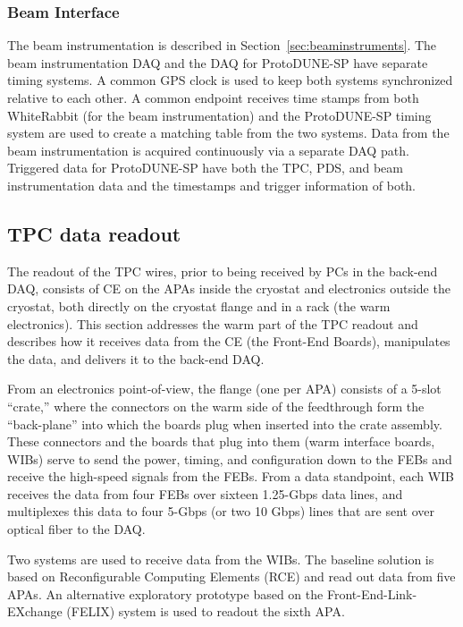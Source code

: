 \subsubsection{Beam Interface}

The beam instrumentation is described in Section~\ref{sec:beaminstruments}.
The beam instrumentation DAQ and the DAQ for ProtoDUNE-SP
have separate timing systems.  A common GPS clock is used to keep both
systems synchronized relative to each other.  A common endpoint receives time stamps 
from both WhiteRabbit (for the beam instrumentation) and the ProtoDUNE-SP timing system
are used to create a matching table from the two systems.  
Data from the beam
instrumentation is acquired continuously via a separate DAQ path.   Triggered
data for ProtoDUNE-SP have both the TPC, PDS, and beam instrumentation data and 
the timestamps and trigger information of both. 

\subsection{TPC data readout}

The readout of the TPC wires, prior to being received by PCs in
the back-end DAQ, consists of  CE on the APAs
inside the cryostat and electronics outside
the cryostat, both directly on the cryostat flange and in a rack (the
warm electronics).  This section
addresses the warm part of the TPC
readout and describes how it receives data from the CE (the Front-End
Boards), manipulates the data, and delivers it to the back-end DAQ.

From an electronics point-of-view, the flange (one per APA) consists of a
5-slot ``crate,'' where the connectors on the warm side of the feedthrough 
form the ``back-plane'' into which the boards plug when inserted
into the crate assembly. 
  These connectors and the boards that plug
into them (warm interface boards, WIBs) serve to send the power,
timing, and configuration down to the FEBs  and receive the high-speed
signals from the FEBs. From a data standpoint, each WIB receives the
data from four FEBs over sixteen 1.25-Gbps data lines, and multiplexes
this data to four 5-Gbps (or two 10 Gbps) lines that are sent over
optical fiber to the DAQ.

Two systems are used to receive data from the WIBs.  The baseline
solution is based on Reconfigurable Computing Elements (RCE) and 
read out data from five APAs.  An alternative exploratory prototype based on
the Front-End-Link-EXchange (FELIX) system is used to readout the sixth APA.

